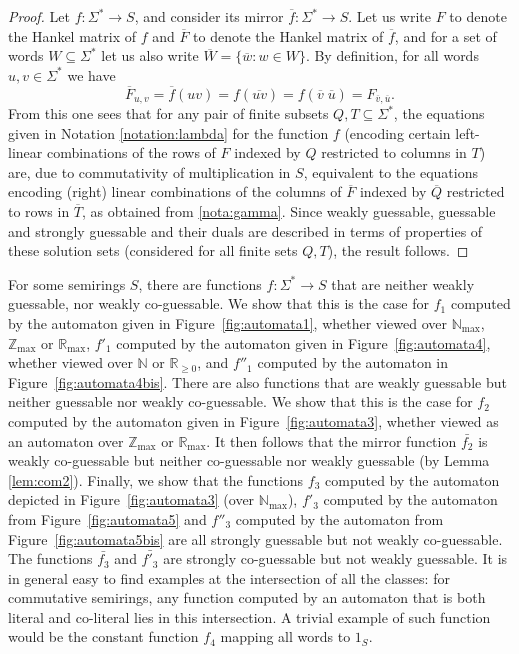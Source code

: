 \documentclass[10pt,a4paper]{amsart}
\theoremstyle{definition}
\numberwithin{equation}{section}
\numberwithin{theorem}{section}
\begin{document}
\begin{proof}

Let $f: \Sigma^* \rightarrow S$, and consider its mirror $\overline{f}: \Sigma^* \rightarrow S$. Let us write $F$ to denote the Hankel matrix of $f$ and $\overline{F}$ to denote the Hankel matrix of $\overline{f}$, and for a set of words $W \subseteq \Sigma^*$ let us also write $\overline{W} = \{\overline{w}: w \in W\}$. By definition, for all words $u, v \in \Sigma^*$ we have $$\overline{F}_{u,v} = \overline{f}(uv) = f(\overline{uv}) = f(\overline{v} \; \overline{u}) = F_{\overline{v}, \overline{u}}.$$
From this one sees that for any pair of finite subsets $Q, T \subseteq \Sigma^*$, the equations given in Notation \ref{notation:lambda} for the function $f$ (encoding certain left-linear combinations of the rows of $F$ indexed by $Q$ restricted to columns in $T$)
are, due to commutativity of multiplication in $S$, equivalent to the equations  encoding (right) linear combinations of the columns of $\overline{F}$ indexed by $\overline{Q}$ restricted to rows in $\overline{T}$, as obtained from \ref{nota:gamma}. Since weakly guessable, guessable and strongly guessable and their duals are described in terms of properties of these solution sets (considered for all finite sets $Q, T$), the result follows. 
\end{proof}


For some semirings $S$, there are functions $f: \Sigma^* \rightarrow S$ that are neither weakly guessable, nor weakly co-guessable. We show that this is the case for $f_1$ computed by the automaton given in Figure~\ref{fig:automata1}, whether viewed over $\mathbb{N}_{\max}$, $\mathbb{Z}_{\max}$ or $\mathbb{R}_{\max}$, $f'_1$ computed by the automaton given in Figure~\ref{fig:automata4}, whether viewed over $\mathbb{N}$ or $\mathbb{R}_{\geq 0}$, and $f''_1$ computed by the automaton in Figure~\ref{fig:automata4bis}. There are also functions that are weakly guessable but neither guessable nor weakly co-guessable. We show that this is the case for $f_2$ computed by the automaton given in Figure~\ref{fig:automata3}, whether viewed as an automaton over $\mathbb{Z}_{\max}$ or $\mathbb{R}_{\max}$. It then follows that the mirror function $\bar{f_2}$ is weakly co-guessable but neither co-guessable nor weakly guessable (by Lemma \ref{lem:com2}). Finally, we show that the functions $f_3$ computed by the automaton depicted in Figure~\ref{fig:automata3} (over $\mathbb{N}_{\max}$), $f'_3$ computed by the automaton from Figure~\ref{fig:automata5} and $f''_3$ computed by the automaton from Figure~\ref{fig:automata5bis} are all strongly guessable but not weakly co-guessable. The functions $\bar{f_3}$ and $\bar{f'_3}$ are strongly co-guessable but not weakly guessable. 
It is in general easy to find examples at the intersection of all the classes: for commutative semirings, any function computed by an automaton that is both literal and co-literal lies in this intersection. A trivial example of such function would be the constant function $f_4$ mapping all words to $1_S$.
\end{document}
